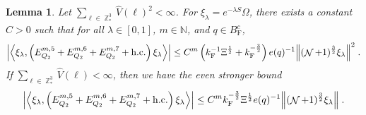 \documentclass[12pt,a4paper]{article}
\numberwithin{equation}{section}
\newcommand{\NNN}{\mathbb{N}}
\newcommand{\1}{\mathbb{I}}
\newcommand{\F}{\mathrm{F}}
\DeclareMathOperator{\Z}{\mathbb{Z}}
\DeclareMathOperator{\NN}{\mathcal{N}}
\newcommand{\half}{\frac{1}{2}}
\newcommand{\eva}[1]{\left\langle #1 \right\rangle}
\theoremstyle{plain}
\newtheorem{lemma}[theorem]{Lemma}
\theoremstyle{definition}
\theoremstyle{remark}
\theoremstyle{plain}
\theoremstyle{definition}
\theoremstyle{remark}
\begin{document}
\begin{lemma} \label{lem:EQ213}
Let $ \sum_{\ell \in \Z^3_*} \hat{V}(\ell)^2 < \infty $. For $\xi_\lambda = e^{-\lambda S} \Omega$, there exists a constant $ C > 0 $ such that for all $ \lambda \in [0,1] $, $ m \in \NNN $, and $ q \in B_{\F}^c $,
\begin{equation}
\begin{aligned}
	\abs{\eva{\xi_\lambda,\left(E^{m,5}_{Q_2}+E^{m,6}_{Q_2}+E^{m,7}_{Q_2}+\mathrm{h.c.}\right) \xi_\lambda }}
	\leq C^m \left( k_{\F}^{-1} \Xi^{\half}
		+ k_{\F}^{-\frac 32} \right)
		e(q)^{-1}
		\norm { (\NN+1)^{\frac 32} \xi_\lambda }^2 \;. \label{eq:estEQ213_Coulomb}
\end{aligned}
\end{equation}
If $ \sum_{\ell \in \Z^3_*} \hat{V}(\ell) < \infty $, then we have the even stronger bound
\begin{equation}
\begin{aligned}
	\abs{\eva{\xi_\lambda,\left(E^{m,5}_{Q_2}+E^{m,6}_{Q_2}+E^{m,7}_{Q_2}+\mathrm{h.c.}\right) \xi_\lambda }}
	\leq C^m k_{\F}^{-\frac 32} \Xi^{\half} e(q)^{-1}
		\norm { (\NN+1)^{\frac 32} \xi_\lambda } \;. \label{eq:estEQ213}
\end{aligned}
\end{equation}
\end{lemma}

\end{document}
